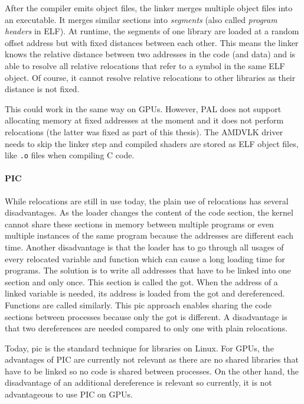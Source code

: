 After the compiler emits object files, the linker merges multiple object files into an executable. It merges similar sections into \emph{segments} (also called \emph{program headers} in ELF). At runtime, the segments of one library are loaded at a random offset address but with fixed distances between each other. This means the linker knows the relative distance between two addresses in the code (and data) and is able to resolve all relative relocations that refer to a symbol in the same ELF object. Of course, it cannot resolve relative relocations to other libraries as their distance is not fixed.

This could work in the same way on GPUs. However, PAL does not support allocating memory at fixed addresses at the moment and it does not perform relocations (the latter was fixed as part of this thesis). The AMDVLK driver needs to skip the linker step and compiled shaders are stored as ELF object files, like \texttt{.o} files when compiling C code.

\paragraph{PIC} While relocations are still in use today, the plain use of relocations has several disadvantages. As the loader changes the content of the code section, the kernel cannot share these sections in memory between multiple programs or even multiple instances of the same program because the addresses are different each time.
Another disadvantage is that the loader has to go through all usages of every relocated variable and function which can cause a long loading time for programs. The solution is to write all addresses that have to be linked into one section and only once. This section is called the \gls{got}.
When the address of a linked variable is needed, its address is loaded from the \gls{got} and dereferenced. Functions are called similarly. This \gls{pic} approach enables sharing the code sections between processes because only the \gls{got} is different. A disadvantage is that two dereferences are needed compared to only one with plain relocations.~\cite{BenderskyPic}

Today, \gls{pic} is the standard technique for libraries on Linux. For GPUs, the advantages of PIC are currently not relevant as there are no shared libraries that have to be linked so no code is shared between processes. On the other hand, the disadvantage of an additional dereference is relevant so currently, it is not advantageous to use PIC on GPUs.
